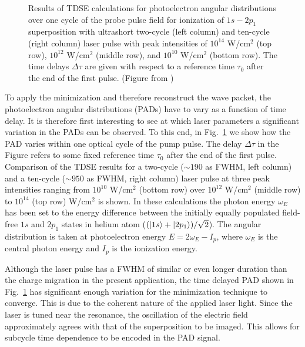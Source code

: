 \begin{figure}[!ht]
\caption{
Results of TDSE calculations for photoelectron angular distributions over one cycle of the probe pulse field for ionization of $1s - 2p_1$ superposition with ultrashort two-cycle (left column) and ten-cycle (right column) laser pulse with peak intensities of $10^{14}$ W/cm$^2$ (top row), $10^{12}$ W/cm$^2$ (middle row), and $10^{10}$ W/cm$^2$ (bottom row). The time delays $\Delta \tau$ are given with respect to a reference time $\tau_0$ after the end of the first pulse. (Figure from \cite{venzke2021_wave})
} 
  \label{fig:pad_vs_time}
\end{figure}

To apply the minimization and therefore reconstruct the wave packet, the photoelectron angular distributions (PADs) have to vary as a function of time delay. It is therefore first interesting to see at which laser parameters a significant variation in the PADs can be observed. To this end,
in Fig.~\ref{fig:pad_vs_time} we show how the PAD varies within one optical cycle of the pump pulse.
The delay $\Delta \tau$ in the Figure refers to some fixed reference time $\tau_0$ after the end of the first pulse. Comparison of the TDSE results for a two-cycle ($\sim190$ as FWHM, left column) and a ten-cycle ($\sim950$ as FWHM, right column) laser pulse at three peak intensities ranging from $10^{10}$ W/cm$^2$ (bottom row) over $10^{12}$ W/cm$^2$ (middle row) to $10^{14}$ (top row) W/cm$^2$ is shown. In these calculations the photon energy $\omega_E$ has been set to the energy difference between the initially equally populated field-free $1s$ and $2p_1$ states in helium atom ($(\ket{1s}+\ket{2p_1})/\sqrt{2}$). The angular distribution is taken at photoelectron energy $E = 2\omega_E - I_p$, where $\omega_E$ is the central photon energy and $I_p$ is the ionization energy. 

Although the laser pulse has a FWHM of similar or even longer duration than the charge migration in the present application, the time delayed PAD shown in Fig.~\ref{fig:pad_vs_time} has significant enough variation for the minimization technique to converge. This is due to the coherent nature of the applied laser light. Since the laser is tuned near the resonance, the oscillation of the electric field approximately agrees with that of the superposition to be imaged. This allows for subcycle time dependence to be encoded in the PAD signal.

